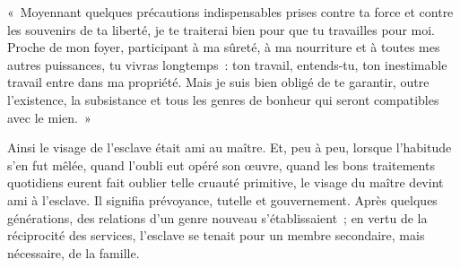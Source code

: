 \documentclass[french,twoside]{book} %
\newcommand{\astermono}{\medskip\centerline{\color{rubric}\large\selectfont{\syms ✻}}\medskip\par}%
\begin{document}
« Moyennant quelques précautions indispensables prises contre ta force et contre les souvenirs de ta liberté, je te traiterai bien pour que tu travailles pour moi. Proche de mon foyer, participant à ma sûreté, à ma nourriture et à toutes mes autres puissances, tu vivras longtemps : ton travail, entends-tu, ton inestimable travail entre dans ma propriété. Mais je suis bien obligé de te garantir, outre l’existence, la subsistance et tous les genres de bonheur qui seront compatibles avec le mien. »\par
Ainsi le visage de l’esclave était ami au maître. Et, peu à peu, lorsque l’habitude s’en fut mêlée, quand l’oubli eut opéré son œuvre, quand les bons traitements quotidiens eurent fait oublier telle cruauté primitive, le visage du maître devint ami à l’esclave. Il signifia prévoyance, tutelle et gouvernement. Après quelques générations, des relations d’un genre nouveau s’établissaient ; en vertu de la réciprocité des services, l’esclave se tenait pour un membre secondaire, mais nécessaire, de la famille.\par

\astermono
\end{document}
